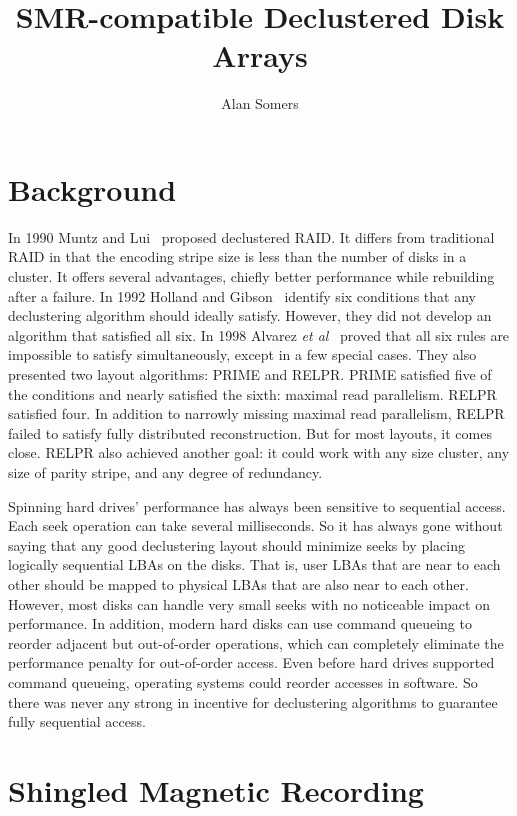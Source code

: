\documentclass[onecolumn,draft]{IEEEtran}
\title{SMR-compatible Declustered Disk Arrays}
\author{Alan Somers}
\begin{document}
\maketitle

\section{Background}

In 1990 Muntz and Lui~\cite{declust1} proposed declustered RAID.  It differs
from traditional RAID in that the encoding stripe size is less than the number
of disks in a cluster.  It offers several advantages, chiefly better
performance while rebuilding after a failure.  In 1992 Holland and
Gibson~\cite{sixrules} identify six conditions that any declustering algorithm
should ideally satisfy.  However, they did not develop an algorithm that
satisfied all six.  In 1998 Alvarez \emph{et al}~\cite{relpr} proved that all
six rules are impossible to satisfy simultaneously, except in a few special
cases.  They also presented two layout algorithms: PRIME and RELPR.  PRIME
satisfied five of the conditions and nearly satisfied the sixth: maximal read
parallelism.  RELPR satisfied four.  In addition to narrowly missing maximal
read parallelism, RELPR failed to satisfy fully distributed reconstruction.
But for most layouts, it comes close.  RELPR also achieved another goal: it
could work with any size cluster, any size of parity stripe, and any degree of
redundancy.

Spinning hard drives' performance has always been sensitive to sequential
access.  Each seek operation can take several milliseconds.  So it has always
gone without saying that any good declustering layout should minimize seeks by
placing logically sequential LBAs on the disks.  That is, user LBAs that are
near to each other should be mapped to physical LBAs that are also near to each
other.  However, most disks can handle very small seeks with no noticeable
impact on performance.  In addition, modern hard disks can use command queueing
to reorder adjacent but out-of-order operations, which can completely eliminate
the performance penalty for out-of-order access.  Even before hard drives
supported command queueing, operating systems could reorder accesses in
software.  So there was never any strong in incentive for declustering
algorithms to guarantee fully sequential access.

\section{Shingled Magnetic Recording}
\end{document}
